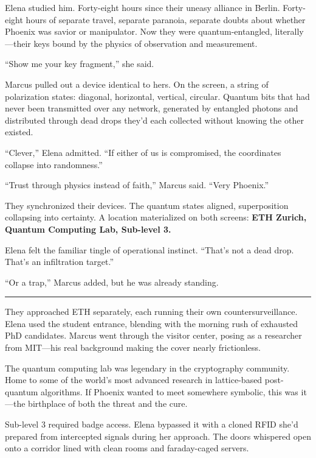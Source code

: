Elena studied him. Forty-eight hours since their uneasy alliance in Berlin. Forty-eight hours of separate travel, separate paranoia, separate doubts about whether Phoenix was savior or manipulator. Now they were quantum-entangled, literally---their keys bound by the physics of observation and measurement.

``Show me your key fragment,'' she said.

Marcus pulled out a device identical to hers. On the screen, a string of polarization states: diagonal, horizontal, vertical, circular. Quantum bits that had never been transmitted over any network, generated by entangled photons and distributed through dead drops they'd each collected without knowing the other existed.

``Clever,'' Elena admitted. ``If either of us is compromised, the coordinates collapse into randomness.''

``Trust through physics instead of faith,'' Marcus said. ``Very Phoenix.''

They synchronized their devices. The quantum states aligned, superposition collapsing into certainty. A location materialized on both screens: \textbf{ETH Zurich, Quantum Computing Lab, Sub-level 3.}

Elena felt the familiar tingle of operational instinct. ``That's not a dead drop. That's an infiltration target.''

``Or a trap,'' Marcus added, but he was already standing.

\begin{center}\rule{0.5\linewidth}{0.5pt}\end{center}

They approached ETH separately, each running their own countersurveillance. Elena used the student entrance, blending with the morning rush of exhausted PhD candidates. Marcus went through the visitor center, posing as a researcher from MIT---his real background making the cover nearly frictionless.

The quantum computing lab was legendary in the cryptography community. Home to some of the world's most advanced research in lattice-based post-quantum algorithms. If Phoenix wanted to meet somewhere symbolic, this was it---the birthplace of both the threat and the cure.

Sub-level 3 required badge access. Elena bypassed it with a cloned RFID she'd prepared from intercepted signals during her approach. The doors whispered open onto a corridor lined with clean rooms and faraday-caged servers.


